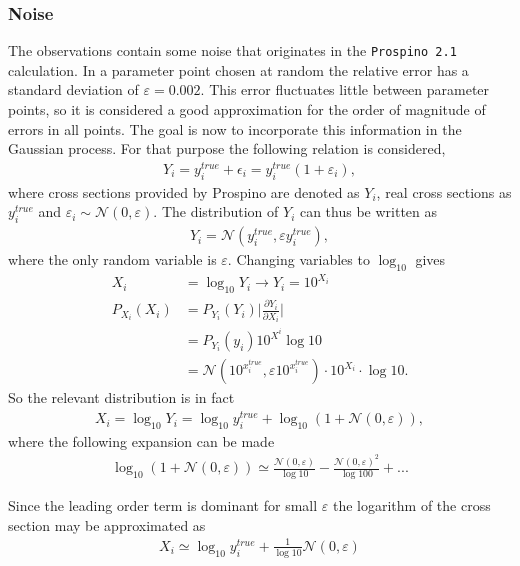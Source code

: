 \documentclass[twoside,english]{uiofysmaster}
\begin{document}
\subsubsection{Noise}

The observations contain some noise that originates in the \verb|Prospino 2.1| calculation. In a parameter point chosen at random the relative error has a standard deviation of $\varepsilon = 0.002$. This error fluctuates little between parameter points, so it is considered a good approximation for the order of magnitude of errors in all points. The goal is now to incorporate this information in the Gaussian process. For that purpose the following relation is considered,
\begin{align}\label{Eq:: cross section w/ error}
Y_i = y^{true}_i + \epsilon_i = y_i^{true}(1 + \varepsilon_i),
\end{align}
where cross sections provided by Prospino are denoted as $Y_i$, real cross sections as $y_i^{true}$ and $\varepsilon_i \sim \mathcal{N}(0, \varepsilon)$. The distribution of $Y_i$ can thus be written as 
\begin{align}
Y_i = \mathcal{N}(y_i^{true}, \varepsilon y_i^{true}),
\end{align}
where the only random variable is $\varepsilon$. Changing variables to $\log_{10}$ gives
\begin{align}
X_i &= \log_{10} Y_i \rightarrow Y_i = 10^{X_i}\\
P_{X_i} (X_i) &= P_{Y_i} (Y_i) \Big|\frac{\partial Y_i}{\partial X_i}\Big|\\
&= P_{Y_i} (y_i) 10^{X^i} \log 10\\
&= \mathcal{N} (10^{x_i^{true}}, \varepsilon 10^{x_i^{true}}) \cdot 10^{X_i} \cdot \log 10.
\end{align}
So the relevant distribution is in fact
\begin{align*}
X_i = \log_{10} Y_i = \log_{10} y_i^{true} + \log_{10} (1 + \mathcal{N}(0, \varepsilon)),
\end{align*}
where the following expansion can be made
\begin{align}
\log_{10} (1 + \mathcal{N}(0, \varepsilon)) \simeq \frac{\mathcal{N} (0, \varepsilon)}{\log 10} - \frac{\mathcal{N} (0, \varepsilon)^2}{\log 100} +...
\end{align}

Since the leading order term is dominant for small $\varepsilon$ the logarithm of the cross section may be approximated as
\begin{align}\label{Eq:: cross section log gaussian noise}
X_i \simeq \log_{10} y_i^{true} + \frac{1}{\log 10} \mathcal{N} (0, \varepsilon)
\end{align}
\end{document}
